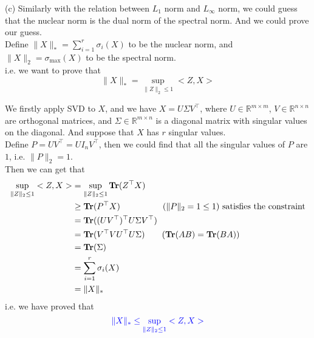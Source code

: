 (c) Similarly with the relation between $L_1$ norm and $L_{\infty}$ norm, we could guess that the nuclear norm is the dual norm of the spectral norm. And we could prove our guess. \\
Define $\|X\|_*=\sum\limits_{i=1}^{r}\sigma_i(X)$ to be the nuclear norm, and $\|X\|_2=\sigma_{\max}(X)$ to be the spectral norm. \\
i.e. we want to prove that
$$\|X\|_* = \sup_{\|Z\|_2 \leq 1} <Z,X>$$

We firstly apply SVD to $X$, and we have $X=U\Sigma V^{\top}$, where $U\in\mathbb{R}^{m\times m}$, $V\in\mathbb{R}^{n\times n}$ are orthogonal matrices, and $\Sigma\in\mathbb{R}^{m\times n}$ is a diagonal matrix with singular values on the diagonal. And suppose that $X$ has $r$ singular values. \\
Define $P=UV^{\top}=UI_nV^{\top}$, then we could find that all the singular values of $P$ are $1$, i.e. $\|P\|_2=1$. \\
Then we can get that
\begin{align*}
\sup_{\|Z\|_2\leq 1}<Z,X> &= \sup_{\|Z\|_2\leq 1}\mathop{\bf Tr}(Z^{\top}X) \\
&\geq \mathop{\bf Tr}(P^{\top}X) \text{\qquad\qquad\quad ($\|P\|_2=1\leq 1$) satisfies the constraint} \\
&= \mathop{\bf Tr}((UV^{\top})^{\top}U\Sigma V^{\top}) \\
&= \mathop{\bf Tr}(V^{\top}VU^{\top}U\Sigma) \text{\qquad ($\mathop{\bf Tr}(AB)=\mathop{\bf Tr}(BA)$)} \\
&= \mathop{\bf Tr}(\Sigma) \\
&= \sum_{i=1}^{r}\sigma_i(X) \\
&= \|X\|_*
\end{align*}
i.e. we have proved that
\begin{equation}
\textcolor{blue}{\|X\|_* \leq \sup_{\|Z\|_2 \leq 1} <Z,X>}
\label{eq:leq}
\end{equation}


